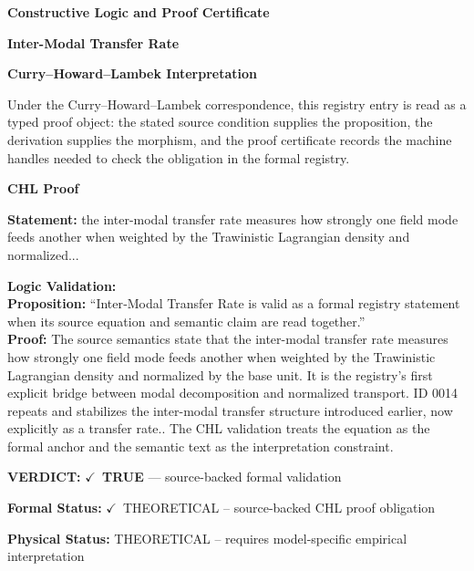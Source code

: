 \clearpage
\begingroup\tzpsupportsetup
\noindent\textbf{\fontsize{10.8pt}{12.8pt}\selectfont [ID 0014] Constructive Logic and Proof Certificate}\par
\noindent\textbf{\fontsize{10pt}{12pt}\selectfont Inter-Modal Transfer Rate}\par
\vspace{0.45em}
\begingroup
\footnotesize
\setlength{\parskip}{0.22em}
\setlength{\parindent}{0pt}
\noindent\textbf{Curry--Howard--Lambek Interpretation}\par
Under the Curry--Howard--Lambek correspondence, this registry entry is read as a typed proof
object: the stated source condition supplies the proposition, the derivation supplies the
morphism, and the proof certificate records the machine handles needed to check the obligation
in the formal registry.

\vspace{0.45em}
\noindent\textbf{CHL Proof}\par
\textbf{Statement:} the inter-modal transfer rate measures how strongly one field mode feeds another when
weighted by the Trawinistic Lagrangian density and normalized...

\textbf{Logic Validation:}\\
\textbf{Proposition:} ``Inter‑Modal Transfer Rate is valid as a formal registry statement when its source
equation and semantic claim are read together.''\\
\textbf{Proof:} The source semantics state that the inter-modal transfer rate measures how strongly one
field mode feeds another when weighted by the Trawinistic Lagrangian density and
normalized by the base unit. It is the registry's first explicit bridge between modal
decomposition and normalized transport. ID 0014 repeats and stabilizes the inter-modal
transfer structure introduced earlier, now explicitly as a transfer rate.. The CHL
validation treats the equation as the formal anchor and the semantic text as the
interpretation constraint.

\textbf{VERDICT:} \ensuremath{\checkmark}\ \textbf{TRUE} --- source-backed formal validation

\textbf{Formal Status:} \ensuremath{\checkmark}\ THEORETICAL -- source-backed CHL proof obligation

\textbf{Physical Status:} THEORETICAL -- requires model-specific empirical interpretation
\par\vspace{0.45em}
\par
\ifTZPDarkEdition
{}
\fi
\endgroup
\endgroup

